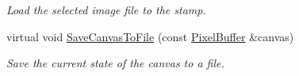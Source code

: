 \begin{DoxyCompactItemize}
\begin{DoxyCompactList}\small\item\em Load the selected image file to the stamp. \end{DoxyCompactList}\item 
virtual void \hyperlink{classimage__tools_1_1IOManager_aa2a3d721fb481208151f5d6ce5aa50ea}{Save\+Canvas\+To\+File} (const \hyperlink{classimage__tools_1_1PixelBuffer}{Pixel\+Buffer} \&canvas)\hypertarget{classimage__tools_1_1IOManager_aa2a3d721fb481208151f5d6ce5aa50ea}{}\label{classimage__tools_1_1IOManager_aa2a3d721fb481208151f5d6ce5aa50ea}

\begin{DoxyCompactList}\small\item\em Save the current state of the canvas to a file. \end{DoxyCompactList}\end{DoxyCompactItemize}
